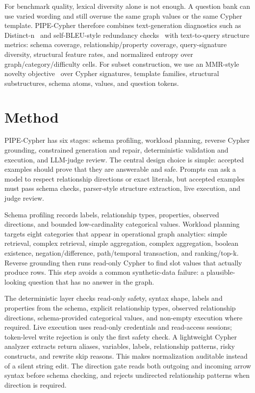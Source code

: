 \documentclass[11pt]{article}
\begin{document}
For benchmark quality, lexical diversity alone is not enough. A question bank can use varied wording and still overuse the same graph values or the same Cypher template. PIPE-Cypher therefore combines text-generation diagnostics such as Distinct-n~\citep{li2016diversity} and self-BLEU-style redundancy checks~\citep{zhu2018texygen} with text-to-query structure metrics: schema coverage, relationship/property coverage, query-signature diversity, structural feature rates, and normalized entropy over graph/category/difficulty cells. For subset construction, we use an MMR-style novelty objective~\citep{carbonell1998mmr} over Cypher signatures, template families, structural substructures, schema atoms, values, and question tokens.

\section{Method}
PIPE-Cypher has six stages: schema profiling, workload planning, reverse Cypher grounding, constrained generation and repair, deterministic validation and execution, and LLM-judge review. The central design choice is simple: accepted examples should prove that they are answerable and safe. Prompts can ask a model to respect relationship directions or exact literals, but accepted examples must pass schema checks, parser-style structure extraction, live execution, and judge review.

Schema profiling records labels, relationship types, properties, observed directions, and bounded low-cardinality categorical values. Workload planning targets eight categories that appear in operational graph analytics: simple retrieval, complex retrieval, simple aggregation, complex aggregation, boolean existence, negation/difference, path/temporal transaction, and ranking/top-k. Reverse grounding then runs read-only Cypher to find slot values that actually produce rows. This step avoids a common synthetic-data failure: a plausible-looking question that has no answer in the graph.

The deterministic layer checks read-only safety, syntax shape, labels and properties from the schema, explicit relationship types, observed relationship directions, schema-provided categorical values, and non-empty execution where required. Live execution uses read-only credentials and read-access sessions; token-level write rejection is only the first safety check. A lightweight Cypher analyzer extracts return aliases, variables, labels, relationship patterns, risky constructs, and rewrite skip reasons. This makes normalization auditable instead of a silent string edit. The direction gate reads both outgoing and incoming arrow syntax before schema checking, and rejects undirected relationship patterns when direction is required.
\end{document}
